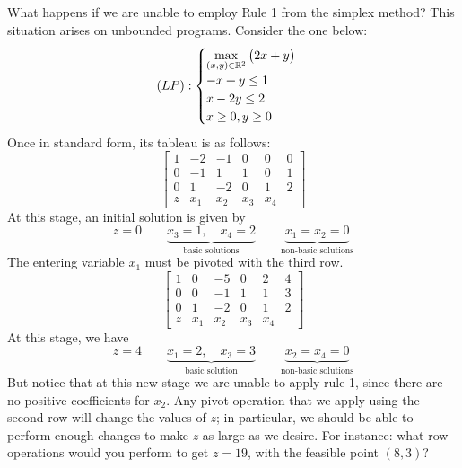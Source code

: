 \begin{example}
What happens if we are unable to employ Rule 1 from the simplex method?  This situation arises on unbounded programs.  Consider the one below:
\begin{equation*}
(LP): \begin{cases}
\displaystyle{\max_{(x,y) \in \mathbb{R}^2} \big( 2x+y \big)} \\
-x+y \leq 1 \\
x - 2y \leq 2 \\
x \geq 0, y \geq 0
\end{cases}
\end{equation*}
Once in standard form, its tableau is as follows:
\begin{equation*}
\begin{bmatrix}
1 & -2  & -1  & 0   & 0   & 0 \\
0 & -1  &  1  & 1   & 0   & 1 \\
0 &  1  & -2  & 0   & 1   & 2 \\ \hline
z & x_1 & x_2 & x_3 & x_4
\end{bmatrix}
\end{equation*}
At this stage, an initial solution is given by
\begin{equation*}
z=0 \qquad \underbrace{x_3=1, \quad x_4=2}_{\text{basic solutions}} \qquad \underbrace{x_1=x_2=0}_{\text{non-basic solutions}}
\end{equation*}
The entering variable $x_1$ must be pivoted with the third row.
\begin{equation*}
\begin{bmatrix}
1 &  0  & -5  & 0   & 2   & 4 \\
0 &  0  & -1  & 1   & 1   & 3 \\
0 &  1  & -2  & 0   & 1   & 2 \\ \hline
z & x_1 & x_2 & x_3 & x_4
\end{bmatrix}
\end{equation*}
At this stage, we have
\begin{equation*}
z=4 \qquad \underbrace{x_1=2, \quad x_3=3}_{\text{basic solution}} \qquad \underbrace{x_2=x_4=0}_{\text{non-basic solutions}}
\end{equation*}
But notice that at this new stage we are unable to apply rule 1, since there are no positive coefficients for $x_2$. Any pivot operation that we apply using the second row will change the values of $z$; in particular, we should be able to perform enough changes to make $z$ as large as we desire.  For instance: what row operations would you perform to get $z=19$, with the feasible point $(8,3)$?
\end{example}

